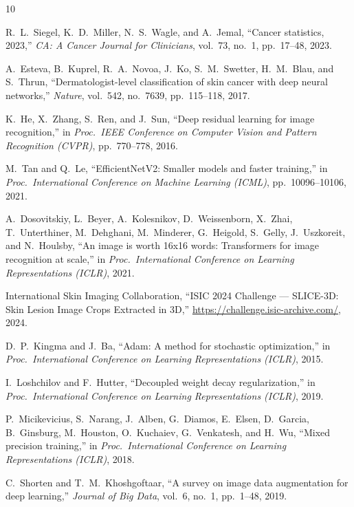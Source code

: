 \documentclass[11pt, a4paper, twocolumn]{article}
\begin{document}
\begin{thebibliography}{10}

R.~L.~Siegel, K.~D.~Miller, N.~S.~Wagle, and A.~Jemal,
``Cancer statistics, 2023,''
\textit{CA: A Cancer Journal for Clinicians}, vol.~73, no.~1,
pp.~17--48, 2023.

A.~Esteva, B.~Kuprel, R.~A.~Novoa, J.~Ko, S.~M.~Swetter,
H.~M.~Blau, and S.~Thrun,
``Dermatologist-level classification of skin cancer with deep
neural networks,''
\textit{Nature}, vol.~542, no.~7639, pp.~115--118, 2017.

K.~He, X.~Zhang, S.~Ren, and J.~Sun,
``Deep residual learning for image recognition,''
in \textit{Proc.\ IEEE Conference on Computer Vision and Pattern
Recognition (CVPR)}, pp.~770--778, 2016.

M.~Tan and Q.~Le,
``EfficientNetV2: Smaller models and faster training,''
in \textit{Proc.\ International Conference on Machine Learning
(ICML)}, pp.~10096--10106, 2021.

A.~Dosovitskiy, L.~Beyer, A.~Kolesnikov, D.~Weissenborn,
X.~Zhai, T.~Unterthiner, M.~Dehghani, M.~Minderer,
G.~Heigold, S.~Gelly, J.~Uszkoreit, and N.~Houlsby,
``An image is worth 16x16 words: Transformers for image
recognition at scale,''
in \textit{Proc.\ International Conference on Learning
Representations (ICLR)}, 2021.

International Skin Imaging Collaboration,
``ISIC 2024 Challenge --- SLICE-3D: Skin Lesion Image Crops
Extracted in 3D,''
\url{https://challenge.isic-archive.com/}, 2024.

D.~P.~Kingma and J.~Ba,
``Adam: A method for stochastic optimization,''
in \textit{Proc.\ International Conference on Learning
Representations (ICLR)}, 2015.

I.~Loshchilov and F.~Hutter,
``Decoupled weight decay regularization,''
in \textit{Proc.\ International Conference on Learning
Representations (ICLR)}, 2019.

P.~Micikevicius, S.~Narang, J.~Alben, G.~Diamos, E.~Elsen,
D.~Garcia, B.~Ginsburg, M.~Houston, O.~Kuchaiev, G.~Venkatesh,
and H.~Wu,
``Mixed precision training,''
in \textit{Proc.\ International Conference on Learning
Representations (ICLR)}, 2018.

C.~Shorten and T.~M.~Khoshgoftaar,
``A survey on image data augmentation for deep learning,''
\textit{Journal of Big Data}, vol.~6, no.~1, pp.~1--48, 2019.

\end{thebibliography}
\end{document}
